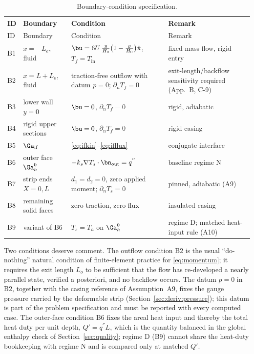 \begin{longtable}{p{1.0cm}p{2.6cm}p{7.2cm}p{3.9cm}}
\caption{Boundary-condition specification.}\label{tab:bcs}\\
\toprule
ID & Boundary & Condition & Remark \\
\midrule
\endfirsthead
\toprule
ID & Boundary & Condition & Remark \\
\midrule
\endhead
B1 & $x=-L_e$, fluid & $\bu=6U\,\tfrac{y}{H_0}\big(1-\tfrac{y}{H_0}\big)\hat{\mathbf x}$, $T_f=T_{\mathrm{in}}$ & fixed mass flow, rigid entry \\
B2 & $x=L+L_o$, fluid & traction-free outflow with datum $p=0$; $\partial_nT_f=0$ & exit-length/backflow sensitivity required (App.~B, C-9) \\
B3 & lower wall $y=0$ & $\bu=0$, $\partial_nT_f=0$ & rigid, adiabatic \\
B4 & rigid upper sections & $\bu=0$, $\partial_nT_f=0$ & rigid casing \\
B5 & $\Ga_{\mathrm{if}}$ & \eqref{eq:ifkin}--\eqref{eq:ifflux} & conjugate interface \\
B6 & outer face $\Ga_h^0$ & $-k_s\nabla T_s\cdot\bn_{\mathrm{out}}=q^{''}$ & baseline regime N \\
B7 & strip ends $X=0,L$ & $d_1=d_2=0$, zero applied moment; $\partial_nT_s=0$ & pinned, adiabatic (A9) \\
B8 & remaining solid faces & zero traction, zero flux & insulated casing \\
B9 & variant of B6 & $T_s=T_h$ on $\Ga_h^0$ & regime D; matched heat-input rule (A10) \\
\bottomrule
\end{longtable}

Two conditions deserve comment. The outflow condition B2 is the usual ``do-nothing'' natural
condition of finite-element practice for \eqref{eq:momentum}; it requires the exit length $L_o$ to
be sufficient that the flow has re-developed a nearly parallel state, verified a posteriori, and no
backflow occurs. The datum $p=0$ in B2, together with the casing reference of Assumption~A9,
fixes the gauge pressure carried by the deformable strip (Section~\ref{sec:deriv:pressure});
this datum is part of the problem specification and must be reported with every computed case. The outer-face condition B6 fixes the areal heat input and thereby the total heat
duty per unit depth, $Q'=q^{''}L$, which is the quantity balanced in the global enthalpy check of
Section~\ref{sec:quality}; regime D (B9) cannot share the heat-duty bookkeeping with regime N and
is compared only at matched $Q'$.

